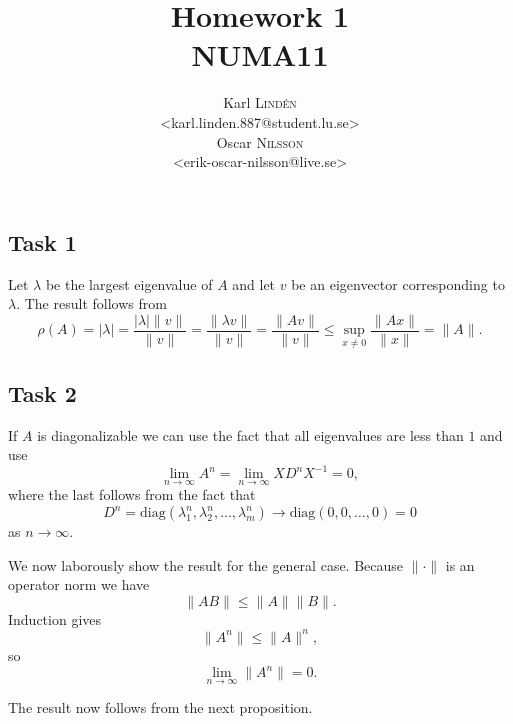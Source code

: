 \documentclass[a4paper,12pt]{article}
\begin{document}
\title{Homework 1 \\ NUMA11}
\author{
  Karl \textsc{Lind\'{e}n} \\
  <karl.linden.887@student.lu.se> \\
  Oscar \textsc{Nilsson} \\
  <erik-oscar-nilsson@live.se>
}

\maketitle
\thispagestyle{empty}
\clearpage

\newpage


\subsection*{Task 1}

Let \(\lambda\) be the largest eigenvalue of \(A\) and let \(v\) be an
eigenvector corresponding to \(\lambda\).
The result follows from
\[
  \rho(A)
    = |\lambda|
    = \frac{|\lambda|\|v\|}{\|v\|}
    = \frac{\|\lambda v\|}{\|v\|}
    = \frac{\|Av\|}{\|v\|}
    \le \sup_{x \ne 0} \frac{\|Ax\|}{\|x\|}
    = \|A\|.
\]


\subsection*{Task 2}

If \(A\) is diagonalizable we can use the fact that all eigenvalues are less
than \(1\) and use
\[ \lim_{n \to \infty} A^n = \lim_{n \to \infty} XD^nX^{-1} = 0, \]
where the last follows from the fact that
\[
  D^n
    = \mathrm{diag}(\lambda_1^n, \lambda_2^n, \dots, \lambda_m^n)
    \to \mathrm{diag}(0, 0, \dots, 0)
    = 0
\]
as \(n \to \infty\).

We now laborously show the result for the general case.
Because \(\|\cdot\|\) is an operator norm we have
\[ \|AB\| \le \|A\|\|B\|. \]
Induction gives
\[ \|A^n\| \le \|A\|^n, \]
so
\[ \lim_{n \to \infty} \|A^n\| = 0. \]

The result now follows from the next proposition.
\end{document}
